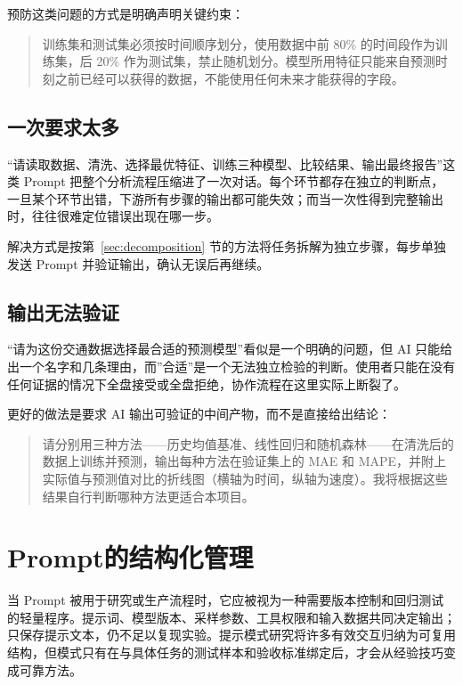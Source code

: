 预防这类问题的方式是明确声明关键约束：

\begin{quote}
训练集和测试集必须按时间顺序划分，使用数据中前 80\% 的时间段作为训练集，后 20\% 作为测试集，禁止随机划分。模型所用特征只能来自预测时刻之前已经可以获得的数据，不能使用任何未来才能获得的字段。
\end{quote}

\subsection{一次要求太多}

“请读取数据、清洗、选择最优特征、训练三种模型、比较结果、输出最终报告”这类 Prompt 把整个分析流程压缩进了一次对话。每个环节都存在独立的判断点，一旦某个环节出错，下游所有步骤的输出都可能失效；而当一次性得到完整输出时，往往很难定位错误出现在哪一步。

解决方式是按第~\ref{sec:decomposition} 节的方法将任务拆解为独立步骤，每步单独发送 Prompt 并验证输出，确认无误后再继续。

\subsection{输出无法验证}

“请为这份交通数据选择最合适的预测模型”看似是一个明确的问题，但 AI 只能给出一个名字和几条理由，而”合适”是一个无法独立检验的判断。使用者只能在没有任何证据的情况下全盘接受或全盘拒绝，协作流程在这里实际上断裂了。

更好的做法是要求 AI 输出可验证的中间产物，而不是直接给出结论：

\begin{quote}
请分别用三种方法——历史均值基准、线性回归和随机森林——在清洗后的数据上训练并预测，输出每种方法在验证集上的 MAE 和 MAPE，并附上实际值与预测值对比的折线图（横轴为时间，纵轴为速度）。我将根据这些结果自行判断哪种方法更适合本项目。
\end{quote}

\section{Prompt的结构化管理}

当 Prompt 被用于研究或生产流程时，它应被视为一种需要版本控制和回归测试的轻量程序。提示词、模型版本、采样参数、工具权限和输入数据共同决定输出；只保存提示文本，仍不足以复现实验。提示模式研究将许多有效交互归纳为可复用结构\cite{white2023prompt}，但模式只有在与具体任务的测试样本和验收标准绑定后，才会从经验技巧变成可靠方法。

